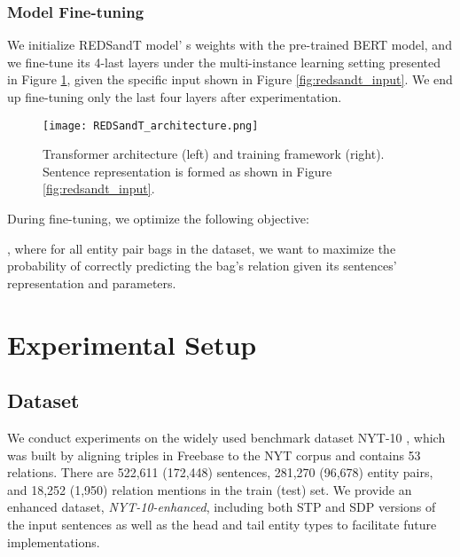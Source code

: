 \documentclass[11pt,a4paper]{article}
\begin{document}
\subsubsection{Model Fine-tuning}
We initialize REDSandT model' s weights with the pre-trained BERT model, and we fine-tune its 4-last layers under the multi-instance learning setting presented in Figure \ref{fig:redsandt_architecture}, given the specific input shown in Figure \ref{fig:redsandt_input}. We end up fine-tuning only the last four layers after experimentation.

 \begin{figure}[b]
    \centering
    \vspace{-4mm}
    \texttt{[image: REDSandT\_architecture.png]}
    \caption{Transformer architecture (left) and training framework (right). Sentence representation  is formed as shown in Figure \ref{fig:redsandt_input}.}
    \label{fig:redsandt_architecture}
    \vspace{-5mm}
\end{figure}

During fine-tuning, we optimize the following objective:

, where for all entity pair bags  in the dataset, we want to maximize the probability of correctly predicting the bag's relation given its sentences' representation and parameters.

\section{Experimental Setup}
\label{sect:experiments}

\subsection{Dataset}
We conduct experiments on the widely used benchmark dataset NYT-10 \cite{Riedel2010}, which was built by aligning triples in Freebase to the NYT corpus and contains 53 relations. There are 522,611 (172,448) sentences, 281,270 (96,678) entity pairs, and 18,252 (1,950) relation mentions in the train (test) set. We provide an enhanced dataset, \textit{NYT-10-enhanced}, including both STP and SDP versions of the input sentences as well as the head and tail entity types to facilitate future implementations.
\end{document}
